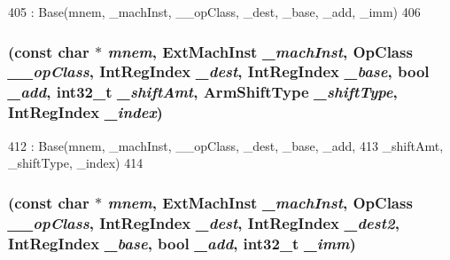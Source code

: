 \begin{DoxyCode}
405         : Base(mnem, _machInst, __opClass, _dest, _base, _add, _imm)
406     {}
\end{DoxyCode}
\hypertarget{classArmISA_1_1MemoryPreIndex_a914aef1c0664bb4080cb22584dc9c7ad}{
\subsubsection[{MemoryPreIndex}]{ (const char $\ast$ {\em mnem}, \/  ExtMachInst {\em \_\-machInst}, \/  OpClass {\em \_\-\_\-opClass}, \/  {\bf IntRegIndex} {\em \_\-dest}, \/  {\bf IntRegIndex} {\em \_\-base}, \/  bool {\em \_\-add}, \/  int32\_\-t {\em \_\-shiftAmt}, \/  {\bf ArmShiftType} {\em \_\-shiftType}, \/  {\bf IntRegIndex} {\em \_\-index})}}
\label{classArmISA_1_1MemoryPreIndex_a914aef1c0664bb4080cb22584dc9c7ad}



\begin{DoxyCode}
412         : Base(mnem, _machInst, __opClass, _dest, _base, _add,
413                 _shiftAmt, _shiftType, _index)
414     {}
\end{DoxyCode}
\hypertarget{classArmISA_1_1MemoryPreIndex_a433de8e6276d28df8ee2acc7b6955542}{
\subsubsection[{MemoryPreIndex}]{ (const char $\ast$ {\em mnem}, \/  ExtMachInst {\em \_\-machInst}, \/  OpClass {\em \_\-\_\-opClass}, \/  {\bf IntRegIndex} {\em \_\-dest}, \/  {\bf IntRegIndex} {\em \_\-dest2}, \/  {\bf IntRegIndex} {\em \_\-base}, \/  bool {\em \_\-add}, \/  int32\_\-t {\em \_\-imm})}}
\label{classArmISA_1_1MemoryPreIndex_a433de8e6276d28df8ee2acc7b6955542}




